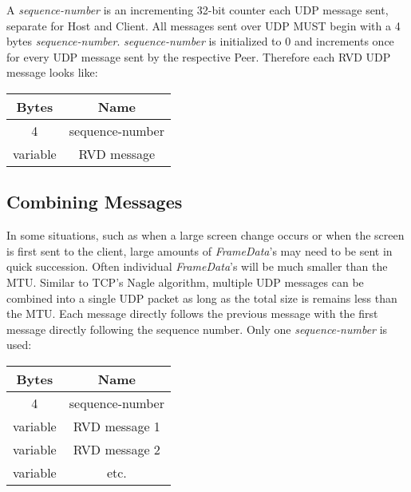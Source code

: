 \documentclass{article}
\begin{document}
    A \emph{sequence-number} is an incrementing 32-bit counter each UDP message sent, separate for Host and Client. All
    messages sent over UDP MUST begin with a 4 bytes \emph{sequence-number}. \emph{sequence-number} is initialized
    to 0 and increments once for every UDP message sent by the respective Peer. Therefore each RVD UDP message looks
    like:

    \begin{center}
        \begin{tabular}{|c|c|}
            \hline
            \textbf{Bytes} & \textbf{Name}   \\
            \hline
            4              & sequence-number \\
            \hline
            variable       & RVD message     \\
            \hline
        \end{tabular}
    \end{center}

    \subsection{Combining Messages}

    In some situations, such as when a large screen change occurs or when the screen is first sent to the client,
    large amounts of \emph{FrameData}'s may need to be sent in quick succession. Often individual \emph{FrameData}'s
    will be much smaller than the MTU. Similar to TCP's Nagle algorithm, multiple UDP messages can be combined into a
    single UDP packet as long as the total size is remains less than the MTU. Each message directly follows the
    previous message with the first message directly following the sequence number. Only one \emph{sequence-number}
    is used:

    \begin{center}
        \begin{tabular}{|c|c|}
            \hline
            \textbf{Bytes} & \textbf{Name}   \\
            \hline
            4              & sequence-number \\
            \hline
            variable       & RVD message 1   \\
            \hline
            variable       & RVD message 2   \\
            \hline
            \hline
            variable       & etc.            \\
            \hline
        \end{tabular}
    \end{center}
\end{document}
